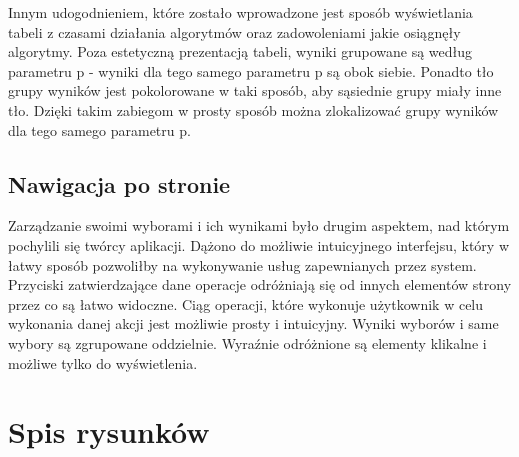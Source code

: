 \documentclass[pdflatex,11pt]{../aghdoc}
\begin{document}
Innym udogodnieniem, które zostało wprowadzone jest sposób wyświetlania tabeli z czasami działania algorytmów oraz zadowoleniami jakie osiągnęły algorytmy. Poza estetyczną prezentacją tabeli, wyniki grupowane są według parametru p - wyniki dla tego samego parametru p są obok siebie. Ponadto tło grupy wyników jest pokolorowane w taki sposób, aby sąsiednie grupy miały inne tło. Dzięki takim zabiegom w prosty sposób można zlokalizować grupy wyników dla tego samego parametru p.

\section{Nawigacja po stronie}

Zarządzanie swoimi wyborami i ich wynikami było drugim aspektem, nad którym pochylili się twórcy aplikacji. Dążono do możliwie intuicyjnego interfejsu, który w łatwy sposób pozwoliłby na wykonywanie usług zapewnianych przez system. Przyciski zatwierdzające dane operacje odróżniają się od innych elementów strony przez co są łatwo widoczne. Ciąg operacji, które wykonuje użytkownik w celu wykonania danej akcji jest możliwie prosty i intuicyjny. Wyniki wyborów i same wybory są zgrupowane oddzielnie. Wyraźnie odróżnione są elementy klikalne i możliwe tylko do wyświetlenia.

\chapter{Spis rysunków}
\label{cha:rysunki}





\end{document}
